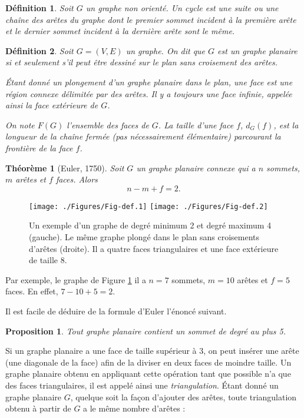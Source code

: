 \documentclass[10pt,a4paper]{article}
\newtheorem{definition}{Définition}
\newtheorem{theorem}{Théorème}
\newtheorem{proposition}{Proposition}
\begin{document}
\begin{definition}
Soit $G$ un graphe non orienté. Un \emph{cycle} est une suite ou une chaîne des arêtes du graphe dont le premier sommet incident à la première arête et le dernier sommet incident à la dernière arête sont le même.
\end{definition}

\begin{definition}
Soit $G=(V,E)$ un graphe. On dit que $G$ est un graphe \emph{planaire} si et seulement s'il peut être dessiné sur le plan sans croisement des arêtes. 

Étant donné un plongement d'un graphe planaire dans le plan, une \emph{face} est une région connexe délimitée par des arêtes. Il y a toujours une face infinie, appelée ainsi la \emph{face extérieure} de $G$.

On note $F(G)$ l'ensemble des faces de $G$. La \emph{taille} d'une face $f$, $d_G(f)$, est la longueur de la chaîne fermée (pas nécessairement élémentaire) parcourant la frontière de la face $f$.
\end{definition}

\begin{theorem}[Euler, 1750]
Soit $G$ un graphe planaire connexe qui a $n$ sommets, $m$ arêtes et $f$ faces. Alors
$$
n - m + f = 2.
$$
\end{theorem}

\begin{figure}[ht]
\centerline{
\texttt{[image: ./Figures/Fig-def.1]}
\hfil
\texttt{[image: ./Figures/Fig-def.2]}
}
\caption{Un exemple d'un graphe de degré minimum 2 et degré maximum 4 (gauche). Le même graphe plongé dans le plan sans croisements d'arêtes (droite). Il a quatre faces triangulaires et une face extérieure de taille 8.}
\label{fig:ex}
\end{figure}

Par exemple, le graphe de Figure \ref{fig:ex} il a $n=7$ sommets, $m=10$ arêtes et $f=5$ faces. En effet, $7 - 10 + 5 = 2$.

Il est facile de déduire de la formule d'Euler l'énoncé suivant.

\begin{proposition}
Tout graphe planaire contient un sommet de degré au plus 5.
\end{proposition}


Si un graphe planaire a une face de taille supérieur à 3, on peut insérer une arête (une diagonale de la face) afin de la diviser en deux faces de moindre taille. Un graphe planaire obtenu en appliquant cette opération tant que possible n'a que des faces triangulaires, il est appelé ainsi une \emph{triangulation}. Étant donné un graphe planaire $G$, quelque soit la façon d'ajouter des arêtes, toute triangulation obtenu à partir de $G$ a le même nombre d'arêtes :
\end{document}
